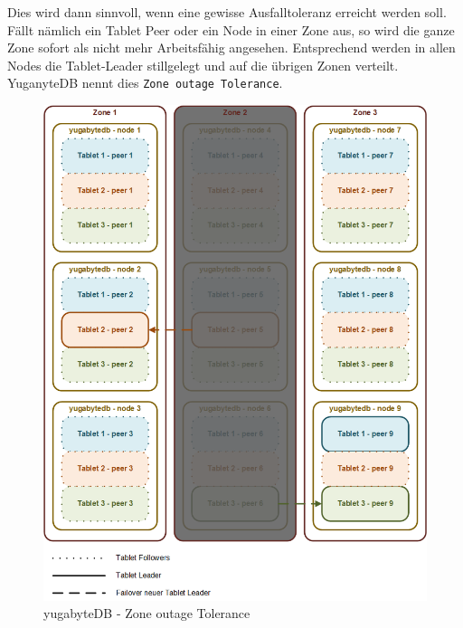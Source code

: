 \begin{flushleft}
    Dies wird dann sinnvoll, wenn eine gewisse Ausfalltoleranz erreicht werden soll.
    Fällt nämlich ein Tablet Peer oder ein Node in einer Zone aus, so wird die ganze Zone sofort als nicht mehr Arbeitsfähig angesehen.
    Entsprechend werden in allen Nodes die Tablet-Leader stillgelegt und auf die übrigen Zonen verteilt.
    YuganyteDB nennt dies \texttt{Zone outage Tolerance}\cite{PTKCP8A4}.
    \begin{figure}[H]
        \centering
        \includegraphics[width=0.8\linewidth]{source/implementation/evaluation/postgresql_ha_solutions/yugabytedb/yugabytedb-zone-outage-tolerance}
        \caption{yugabyteDB - Zone outage Tolerance}
        \label{fig:yugabytedb-zone-outage-tolerance}
    \end{figure}
\end{flushleft}

